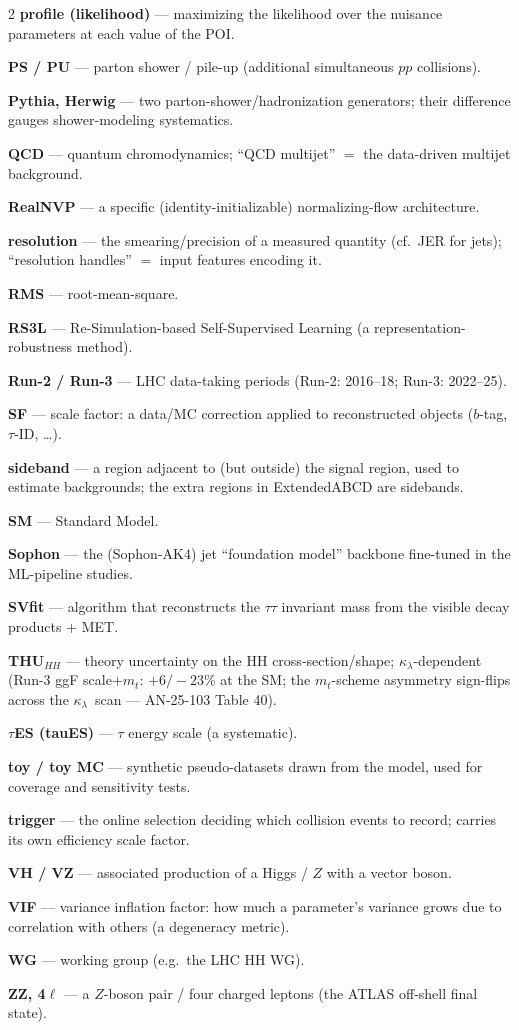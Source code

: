 \documentclass[11pt]{article}
\newcommand{\kl}{\ensuremath{\kappa_\lambda}}
\begin{document}
{\begin{multicols}{2}
\textbf{profile (likelihood)} --- maximizing the likelihood over the nuisance parameters at each value of the POI.

\textbf{PS / PU} --- parton shower / pile-up (additional simultaneous $pp$ collisions).

\textbf{Pythia, Herwig} --- two parton-shower/hadronization generators; their difference gauges shower-modeling systematics.

\textbf{QCD} --- quantum chromodynamics; ``QCD multijet'' $=$ the data-driven multijet background.

\textbf{RealNVP} --- a specific (identity-initializable) normalizing-flow architecture.

\textbf{resolution} --- the smearing/precision of a measured quantity (cf.\ JER for jets); ``resolution handles'' $=$ input features encoding it.

\textbf{RMS} --- root-mean-square.

\textbf{RS3L} --- Re-Simulation-based Self-Supervised Learning (a representation-robustness method).

\textbf{Run-2 / Run-3} --- LHC data-taking periods (Run-2: 2016--18; Run-3: 2022--25).

\textbf{SF} --- scale factor: a data/MC correction applied to reconstructed objects ($b$-tag, $\tau$-ID, \ldots).

\textbf{sideband} --- a region adjacent to (but outside) the signal region, used to estimate backgrounds; the extra regions in ExtendedABCD are sidebands.

\textbf{SM} --- Standard Model.

\textbf{Sophon} --- the (Sophon-AK4) jet ``foundation model'' backbone fine-tuned in the ML-pipeline studies.

\textbf{SVfit} --- algorithm that reconstructs the $\tau\tau$ invariant mass from the visible decay products $+$ MET.

\textbf{THU$_{HH}$} --- theory uncertainty on the HH cross-section/shape; \kl-dependent (Run-3 ggF scale$+m_t$: $+6/-23\%$ at the SM; the $m_t$-scheme asymmetry sign-flips across the \kl\ scan --- AN-25-103 Table 40).

\textbf{$\tau$ES (tauES)} --- $\tau$ energy scale (a systematic).

\textbf{toy / toy MC} --- synthetic pseudo-datasets drawn from the model, used for coverage and sensitivity tests.

\textbf{trigger} --- the online selection deciding which collision events to record; carries its own efficiency scale factor.

\textbf{VH / VZ} --- associated production of a Higgs / $Z$ with a vector boson.

\textbf{VIF} --- variance inflation factor: how much a parameter's variance grows due to correlation with others (a degeneracy metric).

\textbf{WG} --- working group (e.g.\ the LHC HH WG).

\textbf{ZZ, 4$\ell$} --- a $Z$-boson pair / four charged leptons (the ATLAS off-shell final state).
\end{multicols}}
\end{document}

